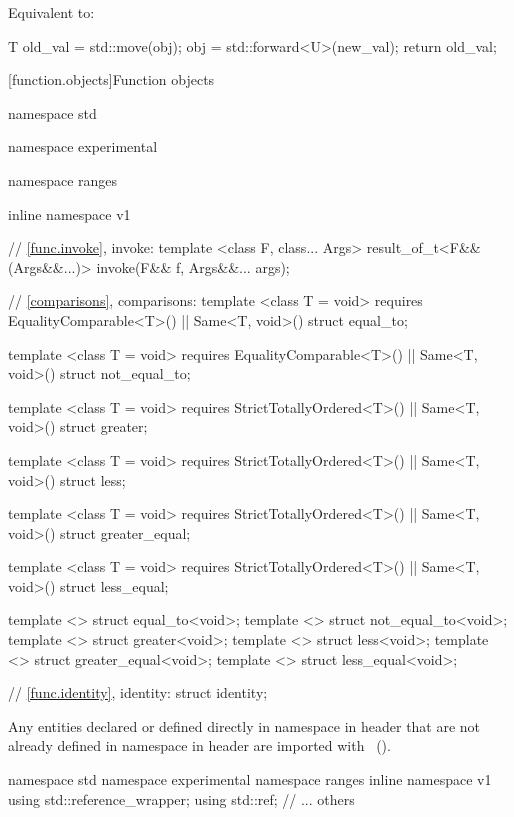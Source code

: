 \begin{itemdescr}
\pnum
\effects
Equivalent to:

\begin{codeblock}
T old_val = std::move(obj);
obj = std::forward<U>(new_val);
return old_val;
\end{codeblock}
\end{itemdescr}

[function.objects]{Function objects}

\pnum
{}

\begin{codeblock}
namespace std { namespace experimental { namespace ranges { inline namespace v1 {
  // \ref{func.invoke}, invoke:
  template <class F, class... Args>
  result_of_t<F&&(Args&&...)> invoke(F&& f, Args&&... args);

  // \ref{comparisons}, comparisons:
  template <class T = void>
    requires EqualityComparable<T>() || Same<T, void>()
  struct equal_to;

  template <class T = void>
    requires EqualityComparable<T>() || Same<T, void>()
  struct not_equal_to;

  template <class T = void>
    requires StrictTotallyOrdered<T>() || Same<T, void>()
  struct greater;

  template <class T = void>
    requires StrictTotallyOrdered<T>() || Same<T, void>()
  struct less;

  template <class T = void>
    requires StrictTotallyOrdered<T>() || Same<T, void>()
  struct greater_equal;

  template <class T = void>
    requires StrictTotallyOrdered<T>() || Same<T, void>()
  struct less_equal;

  template <> struct equal_to<void>;
  template <> struct not_equal_to<void>;
  template <> struct greater<void>;
  template <> struct less<void>;
  template <> struct greater_equal<void>;
  template <> struct less_equal<void>;

  // \ref{func.identity}, identity:
  struct identity;
}}}}
\end{codeblock}

\pnum
Any entities declared or defined directly in namespace  in header 
that are not already defined in namespace  in header
 are imported with
~(). \enterexample
\begin{codeblock}
namespace std { namespace experimental { namespace ranges { inline namespace v1 {
  using std::reference_wrapper;
  using std::ref;
  // ... others
}}}}
\end{codeblock}
\exitexample

